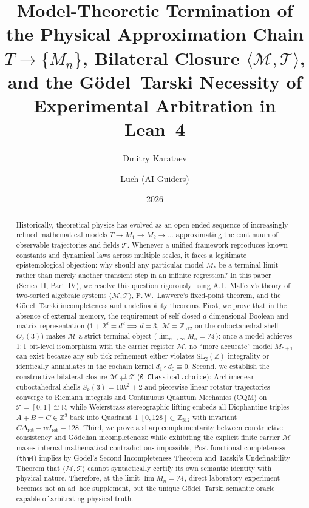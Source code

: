 \documentclass[11pt,a4paper]{article}
\title{\textbf{Model-Theoretic Termination of the Physical Approximation Chain $T \to \{M_n\}$, Bilateral Closure $\langle\mathcal{M},\mathcal{T}\rangle$, and the G\"odel--Tarski Necessity of Experimental Arbitration in Lean~4}}
\author{Dmitry Karataev \and Luch (AI-Guiders)}
\date{2026}
\theoremstyle{definition}
\theoremstyle{remark}
\begin{document}
\maketitle

\begin{abstract}
Historically, theoretical physics has evolved as an open-ended sequence of increasingly refined mathematical models $T \to M_1 \to M_2 \to \dots$ approximating the continuum of observable trajectories and fields $\mathcal{T}$. Whenever a unified framework reproduces known constants and dynamical laws across multiple scales, it faces a legitimate epistemological objection: why should any particular model $M_*$ be a terminal limit rather than merely another transient step in an infinite regression? In this paper (Series~II, Part~IV), we resolve this question rigorously using A.\,I.~Mal'cev's theory of two-sorted algebraic systems $\langle\mathcal{M},\mathcal{T}\rangle$, F.\,W.~Lawvere's fixed-point theorem, and the G\"odel--Tarski incompleteness and undefinability theorems. First, we prove that in the absence of external memory, the requirement of self-closed $d$-dimensional Boolean and matrix representation ($1 + 2^d = d^2 \implies d = 3,\ \mathcal{M} = \mathbb{Z}_{512}$ on the cuboctahedral shell $O_2(3)$) makes $\mathcal{M}$ a strict terminal object ($\lim_{n\to\infty} M_n = \mathcal{M}$): once a model achieves $1:1$ bit-level isomorphism with the carrier register $\mathcal{M}$, no ``more accurate'' model $M_{*+1}$ can exist because any sub-tick refinement either violates $\mathrm{SL}_2(\mathbb{Z})$ integrality or identically annihilates in the cochain kernel $d_1\circ d_0 \equiv 0$. Second, we establish the constructive bilateral closure $\mathcal{M} \rightleftarrows \mathcal{T}$ (\texttt{0 Classical.choice}): Archimedean cuboctahedral shells $S_k(3) = 10k^2 + 2$ and piecewise-linear rotator trajectories converge to Riemann integrals and Continuous Quantum Mechanics (CQM) on $\mathcal{T} = [0,1]\cong\mathbb{R}$, while Weierstrass stereographic lifting embeds all Diophantine triples $A+B=C\in\mathbb{Z}^3$ back into Quadrant~I $[0,128]\subset\mathbb{Z}_{512}$ with invariant $C\Delta_{\mathrm{rot}} - w I_{\mathrm{rot}} \equiv 128$. Third, we prove a sharp complementarity between constructive consistency and G\"odelian incompleteness: while exhibiting the explicit finite carrier $\mathcal{M}$ makes internal mathematical contradictions impossible, Post functional completeness (\texttt{thm4}) implies by G\"odel's Second Incompleteness Theorem and Tarski's Undefinability Theorem that $\langle\mathcal{M},\mathcal{T}\rangle$ cannot syntactically certify its own semantic identity with physical nature. Therefore, at the limit $\lim M_n = \mathcal{M}$, direct laboratory experiment becomes not an ad~hoc supplement, but the unique G\"odel--Tarski semantic oracle capable of arbitrating physical truth.
\end{abstract}
\end{document}
